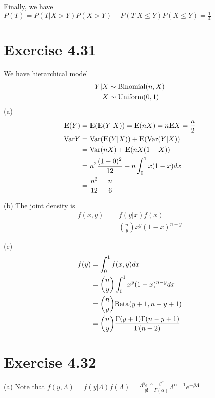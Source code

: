 \documentclass[12pt]{article}
\begin{document}
Finally, we have $P(T) = P(T | X > Y) P(X > Y) + P(T | X \leq Y) P( X \leq Y) = \frac{1}{4}$

\section*{Exercise 4.31}
We have hierarchical model 
$$ \begin{aligned}
Y|X &\sim \mathrm{Binomial} (n, X) \\
X &\sim \mathrm{Uniform}(0,1)
\end{aligned}
$$
(a)
$$ \begin{aligned}
\E(Y)&= \E(\E(Y|X)) = \E(nX) = n \E X = \frac{n}{2} \\
\Var Y &= \Var (\E(Y|X)) + \E(\Var (Y|X)) \\
       &= \Var (nX) + \E (nX(1-X))  \\
       &=  n^2 \frac{(1-0)^2}{12}  + n \int^1_0 x(1-x) dx \\
       &= \frac{n^2}{12} + \frac{n}{6}
\end{aligned}
$$

(b) The joint density is 
$$\begin{aligned}
 f(x, y) &= f(y | x)f(x) \\
 		 &= {n \choose y} x^y (1-x)^{n-y}
\end{aligned} 
$$

(c) 
$$\begin{aligned}
f(y) &= \int_0^1 f(x, y) dx \\ 
&={n \choose y} \int_0^1  x^y (1-x)^{n-y} dx  \\
&= {n \choose y} \mathrm{Beta}(y+1, n-y+1) \\
&= {n \choose y} \frac{\Gamma(y+1)\Gamma(n-y+1)}{\Gamma(n+2)}
\end{aligned} 
$$


\section*{Exercise 4.32}
(a) Note that $f(y, \Lambda) = f(y |\Lambda) f(\Lambda) = \frac{\Lambda^y e^{-\Lambda}}{y!} \frac{\beta^{\alpha}}{\Gamma(\alpha)}\Lambda^{\alpha -1 } e^{-\beta \Lambda}$
\end{document}
